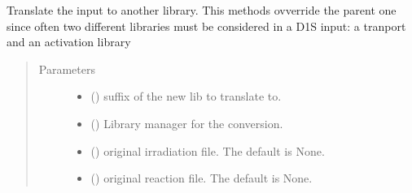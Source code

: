 \documentclass[letterpaper,10pt,english]{sphinxmanual}
\begin{document}
\begin{fulllineitems}
\begin{fulllineitems}
\end{fulllineitems}


\begin{fulllineitems}
\label{\detokenize{api/inputgeneration:inputfile.D1S_Input.translate}}
\sphinxAtStartPar
Translate the input to another library. This methods ovverride the
parent one since often two different libraries must be considered in
a D1S input: a tranport and an activation library
\begin{quote}\begin{description}
\item[{Parameters}] \leavevmode\begin{itemize}
\item {} 
\sphinxAtStartPar
{} () \textendash{} suffix of the new lib to translate to.

\item {} 
\sphinxAtStartPar
{} ({\hyperref[\detokenize{api/initobjects:libmanager.LibManager}]{}}) \textendash{} Library manager for the conversion.

\item {} 
\sphinxAtStartPar
{} (\sphinxstyleliteralemphasis{\sphinxupquote{, }}) \textendash{} original irradiation file. The default is None.

\item {} 
\sphinxAtStartPar
{} (\sphinxstyleliteralemphasis{\sphinxupquote{, }}) \textendash{} original reaction file. The default is None.

\end{itemize}


\end{description}
\end{quote}
\end{fulllineitems}
\end{fulllineitems}
\end{document}
